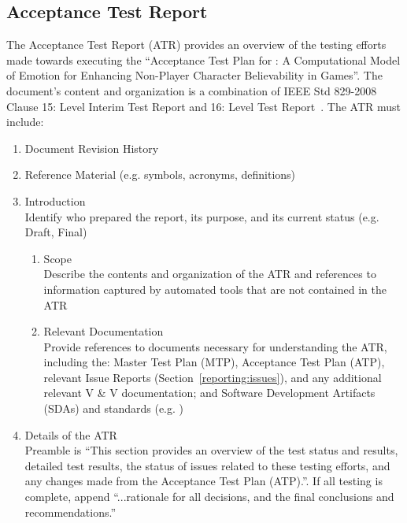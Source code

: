 \subsection{Acceptance Test Report}\label{reporting:atr}
The Acceptance Test Report (ATR) provides an overview of the testing efforts
made towards executing the ``Acceptance Test Plan for \progname{}: A
Computational Model of Emotion for Enhancing Non-Player Character Believability
in Games''. The document's content and organization is a combination of IEEE
Std 829-2008 Clause 15: Level Interim Test Report and 16: Level Test
Report~\citep{vvDocIEEE}. The ATR must include:
\begin{enumerate}

    \item Document Revision History

    \item Reference Material (e.g. symbols, acronyms, definitions)

    \item Introduction \\
    Identify who prepared the report, its purpose, and its current status (e.g.
    Draft, Final)
    \begin{enumerate}

        \item Scope \\
        Describe the contents and organization of the ATR and references to
        information captured by automated tools that are not contained in the
        ATR

        \item Relevant Documentation \\
        Provide references to documents necessary for understanding the ATR,
        including the: Master Test Plan (MTP), Acceptance Test Plan (ATP),
        relevant Issue Reports (Section~\ref{reporting:issues}), and any
        additional relevant V \& V documentation; and Software Development
        Artifacts (SDAs) and standards (e.g. \citet{vvDocIEEE})

    \end{enumerate}

    \item Details of the ATR \\
    Preamble is ``This section provides an overview of the test status and
    results, detailed test results, the status of issues related to these
    testing efforts, and any changes made from the Acceptance Test Plan
    (ATP).''. If all testing is complete, append ``...rationale for all
    decisions, and the final conclusions and recommendations.''
    \begin{enumerate}


\end{enumerate}
\end{enumerate}
